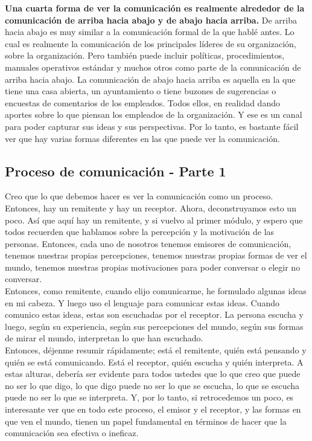 \documentclass[10pt]{book}
\begin{document}
\textbf{Una cuarta forma de ver la comunicación es realmente alrededor de la comunicación de arriba hacia abajo y de abajo hacia arriba.} De arriba hacia abajo es muy similar a la comunicación formal de la que hablé antes. Lo cual es realmente la comunicación de los principales líderes de su organización, sobre la organización. Pero también puede incluir políticas, procedimientos, manuales operativos estándar y muchos otros como parte de la comunicación de arriba hacia abajo. La comunicación de abajo hacia arriba es aquella en la que tiene una casa abierta, un ayuntamiento o tiene buzones de sugerencias o encuestas de comentarios de los empleados. Todos ellos, en realidad dando aportes sobre lo que piensan los empleados de la organización. Y ese es un canal para poder capturar sus ideas y sus perspectivas. Por lo tanto, es bastante fácil ver que hay varias formas diferentes en las que puede ver la comunicación.
\subsection{Proceso de comunicación - Parte 1}
Creo que lo que debemos hacer es ver la comunicación como un proceso. Entonces, hay un remitente y hay un receptor. Ahora, deconstruyamos esto un poco. Así que aquí hay un remitente, y si vuelvo al primer módulo, y espero que todos recuerden que hablamos sobre la percepción y la motivación de las personas. Entonces, cada uno de nosotros tenemos emisores de comunicación, tenemos nuestras propias percepciones, tenemos nuestras propias formas de ver el mundo, tenemos nuestras propias motivaciones para poder conversar o elegir no conversar.\\
Entonces, como remitente, cuando elijo comunicarme, he formulado algunas ideas en mi cabeza. Y luego uso el lenguaje para comunicar estas ideas. Cuando comunico estas ideas, estas son escuchadas por el receptor. La persona escucha y luego, según su experiencia, según sus percepciones del mundo, según sus formas de mirar el mundo, interpretan lo que han escuchado.\\
Entonces, déjenme resumir rápidamente; está el remitente, quién está pensando y quién se está comunicando. Está el receptor, quién escucha y quién interpreta. A estas alturas, debería ser evidente para todos ustedes que lo que creo que puede no ser lo que digo, lo que digo puede no ser lo que se escucha, lo que se escucha puede no ser lo que se interpreta. Y, por lo tanto, si retrocedemos un poco, es interesante ver que en todo este proceso, el emisor y el receptor, y las formas en que ven el mundo, tienen un papel fundamental en términos de hacer que la comunicación sea efectiva o ineficaz.
\end{document}
